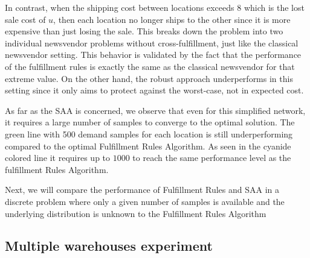 \documentclass[poms,final,blindrev]{poms1_V1} %
\begin{document}
In contrast, when the shipping cost between locations exceeds $8$ which is the lost sale cost of $u$, then each location no longer ships to the other since it is more expensive than just losing the sale. This breaks down the problem into two individual newsvendor problems without cross-fulfillment, just like the classical newsvendor setting. This behavior is validated by the fact that the performance of the fulfillment rules is exactly the same as the classical newsvendor for that extreme value. On the other hand, the robust approach underperforms in this setting since it only aims to protect against the worst-case, not in expected cost. 


As far as the SAA is concerned, we observe that even for this simplified network, it requires a large number of samples to converge to the optimal solution. The green line with 500 demand samples for each location is still underperforming compared to the optimal Fulfillment Rules Algorithm. As seen in the cyanide colored line it requires up to $1000$ to reach the same performance level as the fulfillment Rules Algorithm.


Next, we will compare the performance of Fulfillment Rules and SAA in a discrete problem where only a given number of samples is available and the underlying distribution is unknown to the Fulfillment Rules Algorithm



\subsection{Multiple warehouses experiment}
\end{document}
